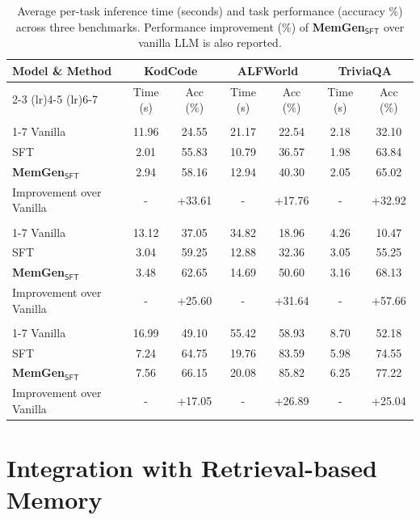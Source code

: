 \documentclass[]{fairmeta}
\newcommand{\ourmethod}{{\fontfamily{lmtt}\selectfont \textbf{MemGen}}\xspace}
\newcommand{\llmname}[1]{{\fontfamily{pcr}\selectfont {#1}}\xspace}
\begin{document}
\begin{table}[!htbp]
\caption{Average per-task inference time (seconds) and task performance (accuracy \%) across three benchmarks. Performance improvement (\%) of \ourmethod$_\mathsf{SFT}$ over vanilla LLM is also reported.}
\label{tab:efficiency}
\centering
\small
\begin{tabular}{l c c c c c c}
\toprule
\textbf{Model \& Method} & \multicolumn{2}{c}{\textbf{KodCode}} & \multicolumn{2}{c}{\textbf{ALFWorld}} & \multicolumn{2}{c}{\textbf{TriviaQA}} \\
\cmidrule(lr){2-3} \cmidrule(lr){4-5} \cmidrule(lr){6-7}
 & Time (s) & Acc (\%) & Time (s) & Acc (\%) & Time (s) & Acc (\%) \\
\midrule
\multicolumn{7}{c}{\llmname{Qwen2.5-1.5B}} \\
\cmidrule(lr){1-7}
Vanilla      & 11.96 & 24.55 & 21.17 & 22.54 & 2.18 & 32.10 \\
SFT          & 2.01 & 55.83 & 10.79 & 36.57 & 1.98 & 63.84 \\ 
\ourmethod$_\mathsf{SFT}$ & 2.94 & 58.16 & 12.94 & 40.30 & 2.05 & 65.02 \\
Improvement over Vanilla & - & +33.61 & - & +17.76 & - & +32.92 \\
\midrule
\multicolumn{7}{c}{\llmname{SmolLM-3B}} \\
\cmidrule(lr){1-7}
Vanilla      & 13.12 & 37.05 & 34.82 & 18.96 & 4.26 & 10.47 \\
SFT          & 3.04 & 59.25 & 12.88 & 32.36 & 3.05 & 55.25 \\ 
\ourmethod$_\mathsf{SFT}$ & 3.48 & 62.65 & 14.69 & 50.60 & 3.16 & 68.13 \\
Improvement over Vanilla & - & +25.60 & - & +31.64 & - & +57.66 \\
\midrule
\multicolumn{7}{c}{\llmname{Qwen3-8B}} \\
\cmidrule(lr){1-7}
Vanilla      & 16.99 & 49.10 & 55.42 & 58.93 & 8.70 & 52.18\\
SFT          & 7.24 & 64.75 & 19.76 & 83.59 & 5.98 & 74.55 \\ 
\ourmethod$_\mathsf{SFT}$ & 7.56 & 66.15 & 20.08 & 85.82 & 6.25 & 77.22 \\
Improvement over Vanilla & - & +17.05 & - & +26.89 & - & +25.04 \\
\bottomrule
\end{tabular}
\end{table}

\section{Integration with Retrieval-based Memory}\label{app:combine-rag}
\end{document}
